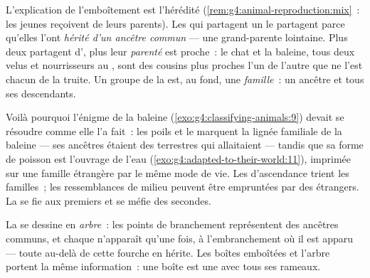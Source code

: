 \begin{proposition}\label{prop:g6:classification-kinship:kinship}
L'explication de l'emboîtement est l'hérédité
(\cref{rem:g4:animal-reproduction:mix}~: les jeunes reçoivent de
leurs parents). Les  qui partagent un  le partagent
parce qu'elles l'ont \emph{hérité d'un ancêtre commun} --- une
 grand-parente lointaine. Plus deux  partagent
d', plus leur \emph{parenté} est proche~: le
chat et la baleine, tous deux velus et nourrisseurs au , sont
des cousins plus proches l'un de l'autre que ne l'est chacun de la
truite. Un groupe de la  est, au fond, une
\emph{famille}~: un ancêtre et tous ses descendants.
\end{proposition}
\admitted

\begin{example}\label{ex:g6:classification-kinship:whale}
Voilà pourquoi l'énigme de la baleine
(\cref{exo:g4:classifying-animals:9}) devait se résoudre comme elle
l'a fait~: les poils et le  marquent la lignée familiale de la
baleine --- ses ancêtres étaient des  terrestres qui
allaitaient --- tandis que sa forme de poisson est l'ouvrage de
l'eau (\cref{exo:g4:adapted-to-their-world:11}), imprimée sur une
famille étrangère par le même mode de vie. Les 
d'ascendance trient les familles~; les ressemblances de milieu
peuvent être empruntées par des étrangers. La  se fie
aux premiers et se méfie des secondes.
\end{example}

\begin{definition}\label{def:g6:classification-kinship:tree}
La  se dessine en \emph{arbre}~: les
points de branchement représentent des ancêtres communs, et chaque
 n'apparaît qu'une fois, à l'embranchement où il est
apparu --- toute  au-delà de cette fourche en hérite. Les
boîtes emboîtées et l'arbre portent la même information~: une boîte
est une  avec tous ses rameaux.
\end{definition}

